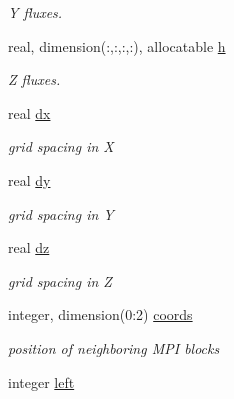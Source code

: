 \begin{DoxyCompactItemize}
\begin{DoxyCompactList}\small\item\em Y fluxes. \end{DoxyCompactList}\item 
\hypertarget{namespaceglobals_af6262d058b86075848725c846e7cc9cc}{}real, dimension(\+:,\+:,\+:,\+:), allocatable \hyperlink{namespaceglobals_af6262d058b86075848725c846e7cc9cc}{h}\label{namespaceglobals_af6262d058b86075848725c846e7cc9cc}

\begin{DoxyCompactList}\small\item\em Z fluxes. \end{DoxyCompactList}\item 
\hypertarget{namespaceglobals_aafee650389fdf595e41e37cb340155ae}{}real \hyperlink{namespaceglobals_aafee650389fdf595e41e37cb340155ae}{dx}\label{namespaceglobals_aafee650389fdf595e41e37cb340155ae}

\begin{DoxyCompactList}\small\item\em grid spacing in X \end{DoxyCompactList}\item 
\hypertarget{namespaceglobals_a9b12323045a0672fe06f9b7091cd3e7a}{}real \hyperlink{namespaceglobals_a9b12323045a0672fe06f9b7091cd3e7a}{dy}\label{namespaceglobals_a9b12323045a0672fe06f9b7091cd3e7a}

\begin{DoxyCompactList}\small\item\em grid spacing in Y \end{DoxyCompactList}\item 
\hypertarget{namespaceglobals_a81293f145f1af171eb88b6feced78c95}{}real \hyperlink{namespaceglobals_a81293f145f1af171eb88b6feced78c95}{dz}\label{namespaceglobals_a81293f145f1af171eb88b6feced78c95}

\begin{DoxyCompactList}\small\item\em grid spacing in Z \end{DoxyCompactList}\item 
\hypertarget{namespaceglobals_a8d38eca539ad2b24a66616e42b79ac4c}{}integer, dimension(0\+:2) \hyperlink{namespaceglobals_a8d38eca539ad2b24a66616e42b79ac4c}{coords}\label{namespaceglobals_a8d38eca539ad2b24a66616e42b79ac4c}

\begin{DoxyCompactList}\small\item\em position of neighboring M\+P\+I blocks \end{DoxyCompactList}\item 
\hypertarget{namespaceglobals_aba9a16c1b0ed3e52dce83157476d099c}{}integer \hyperlink{namespaceglobals_aba9a16c1b0ed3e52dce83157476d099c}{left}\label{namespaceglobals_aba9a16c1b0ed3e52dce83157476d099c}


\end{DoxyCompactItemize}
